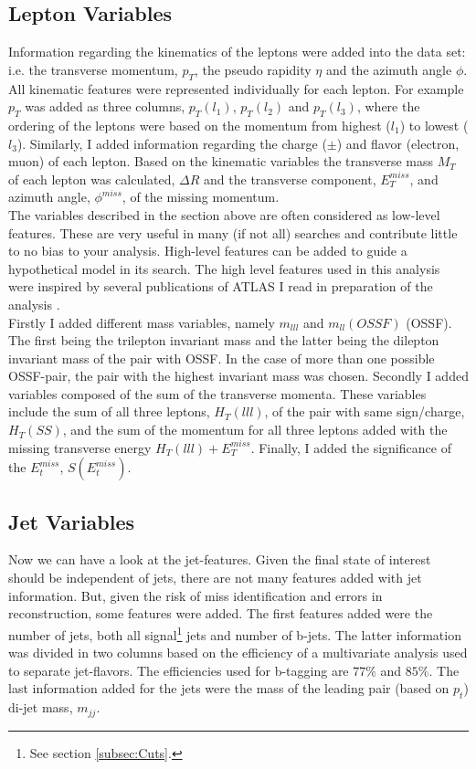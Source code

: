 \subsection{Lepton Variables}\label{subsec:LepSel}
Information regarding the kinematics of the leptons were added into the data set: i.e. the transverse momentum, $p_T$, the pseudo 
rapidity $\eta$ and the azimuth angle $\phi$. All kinematic features were represented individually for each lepton. For example $p_T$
was added as three columns, $p_T(l_1)$, $p_T(l_2)$ and $p_T(l_3)$, where the ordering of the leptons were based on the momentum from highest ($l_1$) to lowest ($l_3$).
Similarly, I added information regarding the charge ($\pm$) and flavor (electron, muon) of each lepton. Based on the kinematic variables
the transverse mass $M_T$ of each lepton was calculated, $\Delta R$ and the transverse component, $E_T^{miss}$, and azimuth angle, $\phi^{miss}$,
of the missing momentum.
\\
The variables described in the section above are often considered as low-level features. These are very useful in many (if not all)
searches and contribute little to no bias to your analysis. High-level features can be added to guide a hypothetical model 
in its search. The high level features used in this analysis were inspired by several publications of \ac{ATLAS} I read in 
preparation of the analysis \cite{franchini_search_2019, atlas_search_2021}. 
\\
Firstly I added different mass variables, namely $m_{lll}$ and $m_{ll}(OSSF)$ (\ac{OSSF}). The first being the trilepton invariant mass 
and the latter being the dilepton invariant mass of the pair with \ac{OSSF}. In the case of more than one possible \ac{OSSF}-pair,
the pair with the highest invariant mass was chosen. Secondly I added variables composed of the sum of the transverse momenta.
These variables include the sum of all three leptons, $H_T(lll)$, of the pair with same sign/charge, $H_T(SS)$, and the sum of the momentum
for all three leptons added with the missing transverse energy $H_T(lll) + E_T^{miss}$. Finally, I added the significance of the
$E_t^{miss}$, $S(E_t^{miss})$.
\subsection{Jet Variables}\label{subsec:JetSel}
Now we can have a look at the jet-features. Given the final state of interest should be independent of jets, there are not many
features added with jet information. But, given the risk of miss identification and errors in reconstruction, some features were 
added. The first features added were the number of jets, both all signal\footnote{See section \ref{subsec:Cuts}.} jets and number of b-jets.
The latter information was divided in two columns based on the efficiency of a multivariate analysis used to separate jet-flavors.
The efficiencies used for b-tagging are $77\%$ and $85\%$. The last information added for the jets were the mass of the leading pair 
(based on $p_t$) di-jet mass, $m_{jj}$.

